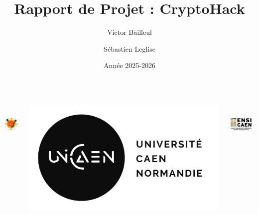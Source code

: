 \documentclass{beamer}
\title{Rapport de Projet : CryptoHack}
\author{Victor Bailleul \and Sébastien Leglise}
\institute{Université de Caen Normandie / ENSICAEN}
\date{Année 2025-2026}
\begin{document}
    \begin{frame}[plain] %
        \titlepage

        \vfill

        \begin{columns}[T, totalwidth=\textwidth]

            \begin{column}{0.33\textwidth}
                \centering
                \includegraphics[height=2cm]{../Main/Images/Others/logo_cryptohack.png}
            \end{column}
            \begin{column}{0.33\textwidth}
                \centering %
                \includegraphics[height=2.cm]{../Main/Images/Others/logo_unicaen.png}
            \end{column}
            \begin{column}{0.33\textwidth}
                \centering
                \includegraphics[height=2cm]{../Main/Images/Others/logo_ensicaen.png}
            \end{column}
        \end{columns}

        \vspace{0.2cm}
    \end{frame}
\end{document}
